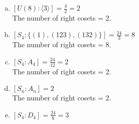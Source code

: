 \begin{enumerate}[(a)]

\item
$[ U(8) : \langle 3 \rangle ] = \frac{4}{2} = 2$
\\
The number of right cosets = 2.


\item
$[S_4 : \{(1), (123), (132)\}] = \frac{24}{3} = 8$
\\
The number of right cosets = 8.

\item
$[S_4 : A_4] = \frac{24}{12} = 2$
\\
The number of right cosets = 2.

\item
$[ S_n : A_n ] = 2$
\\
The number of right cosets = 2.

\item
$[S_4 : D_4] = \frac{24}{8} = 3$


\end{enumerate}

